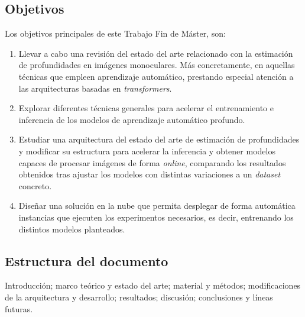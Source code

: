 \subsection{Objetivos}
Los objetivos principales de este Trabajo Fin de Máster, son:
\begin{enumerate}
	\item Llevar a cabo una revisión del estado del arte relacionado con la estimación de profundidades en imágenes monoculares. Más concretamente, en aquellas técnicas que empleen aprendizaje automático, prestando especial atención a las arquitecturas basadas en \textit{transformers}.
    \item Explorar diferentes técnicas generales para acelerar el entrenamiento e inferencia de los modelos de aprendizaje automático profundo. 
    \item Estudiar una arquitectura del estado del arte de estimación de profundidades y modificar su estructura para acelerar la inferencia y obtener modelos capaces de procesar imágenes de forma \textit{online}, comparando los resultados obtenidos tras ajustar los modelos con distintas variaciones a un \textit{dataset} concreto.
    \item Diseñar una solución en la nube que permita desplegar de forma automática instancias que ejecuten los experimentos necesarios, es decir, entrenando los distintos modelos planteados.
\end{enumerate}


\subsection{Estructura del documento}
Introducción; marco teórico y estado del arte; material y métodos; modificaciones de la arquitectura y desarrollo; resultados; discusión; conclusiones y líneas futuras.

\clearpage
